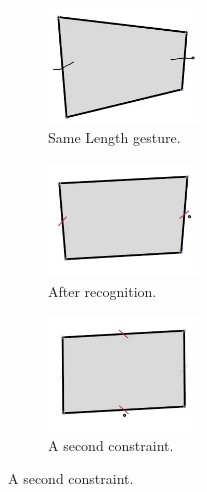 \begin{figure}
  \centering
  \begin{subfigure}[t]{0.28\textwidth}
    \centering
    \includegraphics[width=40mm]{img/same-length-1.png}
    \caption{Same Length gesture.}
    \label{fig:same-length-1}
  \end{subfigure}
  \hspace{1cm} %
  \begin{subfigure}[t]{0.28\textwidth}
    \centering
    \includegraphics[width=40mm]{img/same-length-2.png}
    \caption{After recognition.}
    \label{fig:same-length-2}
  \end{subfigure}
  \hspace{1cm} %
  \begin{subfigure}[t]{0.28\textwidth}
    \centering
    \includegraphics[width=40mm]{img/same-length-3.png}
    \caption{A second constraint.}
    \label{fig:same-length-3}
  \end{subfigure}


\end{figure}
